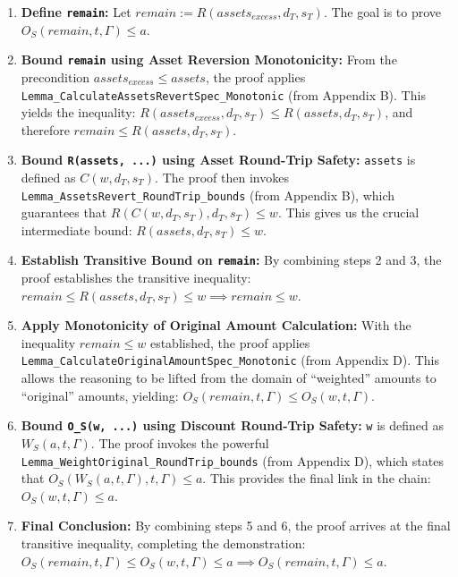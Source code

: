 \documentclass[
  english,
  onecolumn]{article}
\begin{document}
\begin{itemize}
  \begin{enumerate}
  \def\labelenumi{\arabic{enumi}.}
  \item
    \textbf{Define \texttt{remain}:} Let
    \(remain := R(assets_{excess}, d_T, s_T)\). The goal is to prove
    \(O_S(remain, t, \Gamma) \le a\).
  \item
    \textbf{Bound \texttt{remain} using Asset Reversion Monotonicity:}
    From the precondition \(assets_{excess} \le assets\), the proof
    applies \texttt{Lemma\_CalculateAssetsRevertSpec\_Monotonic} (from
    Appendix B). This yields the inequality:
    \(R(assets_{excess}, d_T, s_T) \le R(assets, d_T, s_T)\), and
    therefore \(remain \le R(assets, d_T, s_T)\).
  \item
    \textbf{Bound \texttt{R(assets,\ ...)} using Asset Round-Trip
    Safety:} \texttt{assets} is defined as \(C(w, d_T, s_T)\). The proof
    then invokes \texttt{Lemma\_AssetsRevert\_RoundTrip\_bounds} (from
    Appendix B), which guarantees that
    \(R(C(w, d_T, s_T), d_T, s_T) \le w\). This gives us the crucial
    intermediate bound: \(R(assets, d_T, s_T) \le w\).
  \item
    \textbf{Establish Transitive Bound on \texttt{remain}:} By combining
    steps 2 and 3, the proof establishes the transitive inequality:
    \(remain \le R(assets, d_T, s_T) \le w \implies remain \le w\).
  \item
    \textbf{Apply Monotonicity of Original Amount Calculation:} With the
    inequality \(remain \le w\) established, the proof applies
    \texttt{Lemma\_CalculateOriginalAmountSpec\_Monotonic} (from
    Appendix D). This allows the reasoning to be lifted from the domain
    of ``weighted'' amounts to ``original'' amounts, yielding:
    \(O_S(remain, t, \Gamma) \le O_S(w, t, \Gamma)\).
  \item
    \textbf{Bound \texttt{O\_S(w,\ ...)} using Discount Round-Trip
    Safety:} \texttt{w} is defined as \(W_S(a, t, \Gamma)\). The proof
    invokes the powerful
    \texttt{Lemma\_WeightOriginal\_RoundTrip\_bounds} (from Appendix D),
    which states that \(O_S(W_S(a, t, \Gamma), t, \Gamma) \le a\). This
    provides the final link in the chain: \(O_S(w, t, \Gamma) \le a\).
  \item
    \textbf{Final Conclusion:} By combining steps 5 and 6, the proof
    arrives at the final transitive inequality, completing the
    demonstration:
    \(O_S(remain, t, \Gamma) \le O_S(w, t, \Gamma) \le a \implies O_S(remain, t, \Gamma) \le a\).
  \end{enumerate}

\end{itemize}
\end{document}
